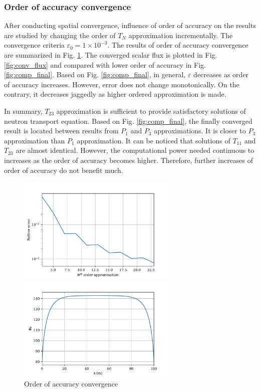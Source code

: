 \documentclass[11pt]{article}
\begin{document}
\begin{spacing}{1.5}
\subsubsection{Order of accuracy convergence}
After conducting spatial convergence, influence of order of accuracy on the results are studied by changing the order of $T_N$ approximation incrementally. The convergence criteria $\varepsilon_0=1\times10^{-3}$. The results of order of accuracy convergence are summarized in Fig. \ref{fig:order_conv}. The converged scalar flux is plotted in Fig. \ref{fig:conv_flux} and compared with lower order of accuracy in Fig. \ref{fig:comp_final}. Based on Fig. \ref{fig:comp_final}, in general, $\varepsilon$ decreases as order of accuracy increases. However, error does not change monotonically. On the contrary, it decreases jaggedly as higher ordered approximation is made.\par
In summary, $T_{23}$ approximation is sufficient to provide satisfactory solutions of neutron transport equation. Based on Fig. \ref{fig:comp_final}, the finally converged result is located between results from $P_1$ and $P_3$ approximations. It is closer to $P_3$ approximation than $P_1$ approximation. It can be noticed that solutions of $T_{11}$ and $T_{23}$ are almost identical. However, the computational power needed continuous to increases as the order of accuracy becomes higher. Therefore, further increases of order of accuracy do not benefit much. 
\begin{figure}[htbp]
\begin{minipage}[t]{0.5\textwidth}
\centering
\includegraphics[width=3in]{order_conv_2.pdf}
\caption{Order of accuracy convergence}\label{fig:order_conv}
\end{minipage}
\begin{minipage}[t]{0.5\textwidth}
\centering
\includegraphics[width=3in]{phi0_final_2.pdf}

\end{minipage}
\end{figure}
\end{spacing}
\end{document}
